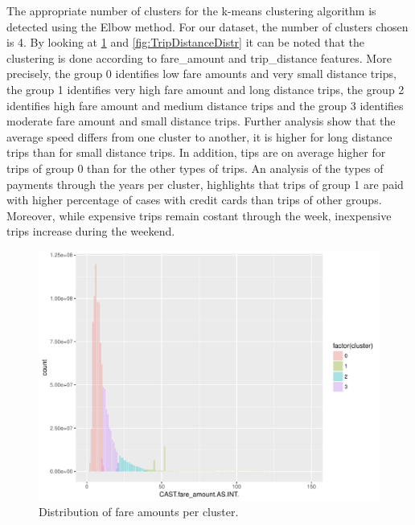 \documentclass{acm_proc_article-sp-sigmod09}
\begin{document}
The appropriate number of clusters for the k-means clustering algorithm is detected using the Elbow method. For our dataset, the number of clusters chosen is 4. By looking at \cref{fig:FareAmountDistr} and \cref{fig:TripDistanceDistr} it can be noted that the clustering is done according to fare\_amount and trip\_distance features. More precisely, the group 0 identifies low fare amounts and very small distance trips, the group 1 identifies very high fare amount and long distance trips, the group 2 identifies high fare amount and medium distance trips and the group 3 identifies moderate fare amount and small distance trips. Further analysis show that the average speed differs from one cluster to another, it is higher for long distance trips than for small distance trips. In addition, tips are on average higher for trips of group 0 than for the other types of trips. An analysis of the types of payments through the years per cluster, highlights that trips of group 1 are paid with higher percentage of cases with credit cards than trips of other groups. Moreover, while expensive trips remain costant through the week, inexpensive trips increase during the weekend.

\begin{figure}
	\centering
	\includegraphics[width=1\columnwidth]{resources/clustered_plots/fare_amount_distr.pdf}
	\caption{Distribution of fare amounts per cluster.}
	\label{fig:FareAmountDistr}
\end{figure}
\end{document}
